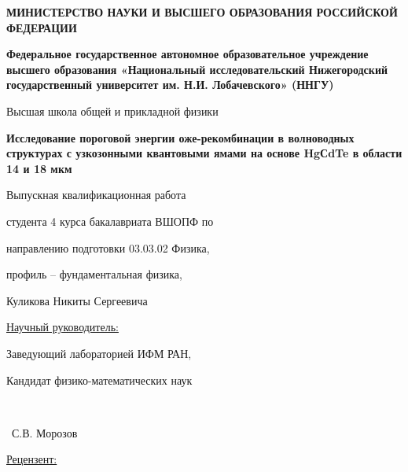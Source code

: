 \documentclass[../main.tex]{subfiles}
\begin{document}
\begin{titlepage}
    \begin{center}
    \textbf{МИНИСТЕРСТВО НАУКИ И ВЫСШЕГО ОБРАЗОВАНИЯ РОССИЙСКОЙ ФЕДЕРАЦИИ}
    
    \textbf{Федеральное государственное автономное образовательное учреждение высшего образования «Национальный исследовательский Нижегородский государственный университет им. Н.И. Лобачевского» (ННГУ)}
    
    \vspace{0.0cm}
    Высшая школа общей и прикладной физики
    
    \end{center}
    
    
    \begin{center}
    \large{\bf{Исследование пороговой энергии оже-рекомбинации в волноводных структурах с узкозонными квантовыми ямами на основе HgСdTe в области 14 и 18 мкм}}
    \end{center}
    
    \begin{flushright}
    Выпускная квалификационная работа
    
    студента 4 курса бакалавриата  ВШОПФ по
    
    направлению подготовки 03.03.02 Физика,
    
    профиль – фундаментальная физика,
    
    Куликова Никиты Сергеевича
    
    \vspace{0.0 cm}
    \underline{Научный руководитель:}
    
    Заведующий лабораторией ИФМ РАН,
    
    Кандидат физико-математических наук
    
    \begin{minipage}[t][0.1 cm][t]{2in}
      \underline{\hspace{2in}}\\ %
      \centering
    \end{minipage}~С.В. Морозов
    
    \vspace{0.0 cm}
     \underline{Рецензент:}
    

\end{flushright}
\end{titlepage}
\end{document}

